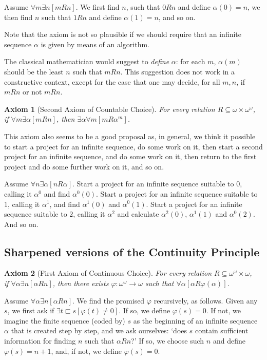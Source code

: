 \documentclass[a4paper]{amsart}
\theoremstyle{plain}
\newtheorem{axiom}{Axiom}
\begin{document}
Assume $\forall m\exists n[mRn]$. We first find $n$, such that $0Rn$ and define $\alpha(0)=n$, we then find $n$ such that $1Rn$ and define $\alpha(1)=n$, and so on.

Note that the axiom is not so plausible if we should require that an infinite sequence $\alpha$ is given by means of an algorithm. 

The classical mathematician would suggest to {\it define} $\alpha$: for each $m$, $\alpha(m)$ should be the least $n$ such that $mRn$. This suggestion does not work in a constructive context, except for the case that one may decide, for all $m, n$, if $mRn$ or not $mRn$. 


\begin{axiom}[Second Axiom of Countable Choice]\label{ax:secondchoice} For every relation $R\subseteq \omega\times\omega^\omega$, \\if $\forall m \exists \alpha [mRn]$, then $\exists \alpha\forall m[m R\alpha^m]$. \end{axiom}

This axiom also seems to be a good proposal as, in general,  we think it possible to start a project for an infinite sequence, do some work on it, then start a second project for an infinite sequence, and do some work on it, then return to the first project and do some further work on it, and so on. 

Assume $\forall n\exists \alpha[nR\alpha]$. Start a project for an infinite sequence suitable to $0$, calling it $\alpha^0$ and find $\alpha^0(0)$. Start a project for an infinite sequence suitable to $1$, calling it $\alpha^1$, and find $\alpha^1(0)$ and $\alpha^0(1)$. Start a project for an infinite sequence suitable to $2$, calling it $\alpha^2$ and calculate $\alpha^2(0)$, $\alpha^1(1)$ and $\alpha^0(2)$. And so on.
\subsection{Sharpened versions of the Continuity Principle}
\begin{axiom}[First Axiom of Continuous Choice]\label{ax:firstacc} For every relation $R\subseteq \omega^\omega\times \omega$,\\ if $\forall \alpha \exists n[\alpha R n]$, then there exists $\varphi:\omega^\omega\rightarrow \omega$ such that $\forall \alpha[\alpha R \varphi(\alpha)]$.  \end{axiom}

Assume $\forall \alpha\exists n[\alpha R n]$. We find the promised $\varphi$ recursively, as follows. Given any $s$, we first ask if $\exists t\sqsubset s[\varphi (t)\neq 0]$. If so, we define $\varphi(s)=0$. If not, we imagine the finite sequence (coded by) $s$ as the beginning of an infinite sequence $\alpha$ that is created step by step, and we ask ourselves: `does $s$ contain sufficient information for finding $n$ such that $\alpha R n$?' If so, we choose such $n$ and define $\varphi(s)=n+1$, and, if not, we define $\varphi(s) =0$.  
\end{document}
